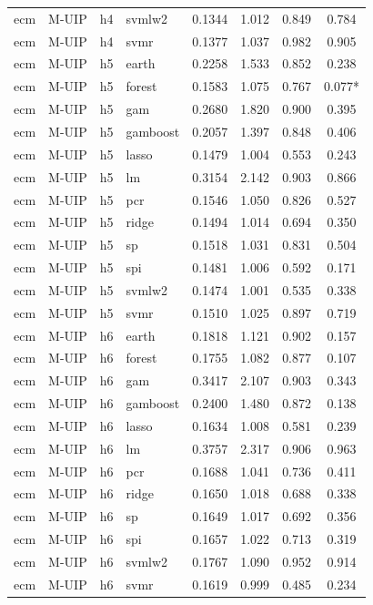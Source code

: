 \begin{ThreePartTable}
\begin{longtable}[t]{llclcccc}
ecm & M-UIP & h4 & svmlw2 & 0.1344 & 1.012 & 0.849 & 0.784\\
ecm & M-UIP & h4 & svmr & 0.1377 & 1.037 & 0.982 & 0.905\\
\addlinespace
ecm & M-UIP & h5 & earth & 0.2258 & 1.533 & 0.852 & 0.238\\
ecm & M-UIP & h5 & forest & 0.1583 & 1.075 & 0.767 & 0.077*\\
ecm & M-UIP & h5 & gam & 0.2680 & 1.820 & 0.900 & 0.395\\
ecm & M-UIP & h5 & gamboost & 0.2057 & 1.397 & 0.848 & 0.406\\
ecm & M-UIP & h5 & lasso & 0.1479 & 1.004 & 0.553 & 0.243\\
ecm & M-UIP & h5 & lm & 0.3154 & 2.142 & 0.903 & 0.866\\
ecm & M-UIP & h5 & pcr & 0.1546 & 1.050 & 0.826 & 0.527\\
ecm & M-UIP & h5 & ridge & 0.1494 & 1.014 & 0.694 & 0.350\\
ecm & M-UIP & h5 & sp & 0.1518 & 1.031 & 0.831 & 0.504\\
ecm & M-UIP & h5 & spi & 0.1481 & 1.006 & 0.592 & 0.171\\
ecm & M-UIP & h5 & svmlw2 & 0.1474 & 1.001 & 0.535 & 0.338\\
ecm & M-UIP & h5 & svmr & 0.1510 & 1.025 & 0.897 & 0.719\\
\addlinespace
ecm & M-UIP & h6 & earth & 0.1818 & 1.121 & 0.902 & 0.157\\
ecm & M-UIP & h6 & forest & 0.1755 & 1.082 & 0.877 & 0.107\\
ecm & M-UIP & h6 & gam & 0.3417 & 2.107 & 0.903 & 0.343\\
ecm & M-UIP & h6 & gamboost & 0.2400 & 1.480 & 0.872 & 0.138\\
ecm & M-UIP & h6 & lasso & 0.1634 & 1.008 & 0.581 & 0.239\\
ecm & M-UIP & h6 & lm & 0.3757 & 2.317 & 0.906 & 0.963\\
ecm & M-UIP & h6 & pcr & 0.1688 & 1.041 & 0.736 & 0.411\\
ecm & M-UIP & h6 & ridge & 0.1650 & 1.018 & 0.688 & 0.338\\
ecm & M-UIP & h6 & sp & 0.1649 & 1.017 & 0.692 & 0.356\\
ecm & M-UIP & h6 & spi & 0.1657 & 1.022 & 0.713 & 0.319\\
ecm & M-UIP & h6 & svmlw2 & 0.1767 & 1.090 & 0.952 & 0.914\\
ecm & M-UIP & h6 & svmr & 0.1619 & 0.999 & 0.485 & 0.234\\

\end{longtable}
\end{ThreePartTable}
